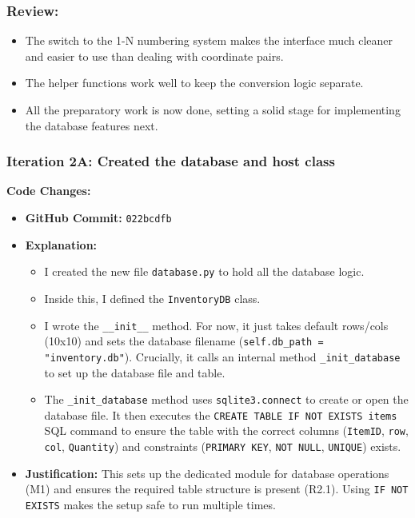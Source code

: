 \subsubsection{Review:}
\begin{itemize}
	\item The switch to the 1-N numbering system makes the interface much cleaner and easier to use than dealing with coordinate pairs.
	\item The helper functions work well to keep the conversion logic separate.
	\item All the preparatory work is now done, setting a solid stage for implementing the database features next.
\end{itemize}

\newpage

\subsubsection{Iteration 2A: Created the database and host class}

\textbf{Code Changes:}
\begin{itemize}
	\item \textbf{GitHub Commit:} \verb|022bcdfb|
	\item \textbf{Explanation:}
	\begin{itemize}
		\item I created the new file \verb|database.py| to hold all the database logic.
		\item Inside this, I defined the \verb|InventoryDB| class.
		\item I wrote the \verb|__init__| method. For now, it just takes default rows/cols (10x10) and sets the database filename (\verb|self.db_path = "inventory.db"|). Crucially, it calls an internal method \verb|_init_database| to set up the database file and table.
		\item The \verb|_init_database| method uses \verb|sqlite3.connect| to create or open the database file. It then executes the \verb|CREATE TABLE IF NOT EXISTS items| SQL command to ensure the table with the correct columns (\verb|ItemID|, \verb|row|, \verb|col|, \verb|Quantity|) and constraints (\verb|PRIMARY KEY|, \verb|NOT NULL|, \verb|UNIQUE|) exists.
	\end{itemize}
	\item \textbf{Justification:} This sets up the dedicated module for database operations (M1) and ensures the required table structure is present (R2.1). Using \verb|IF NOT EXISTS| makes the setup safe to run multiple times.
\end{itemize}

